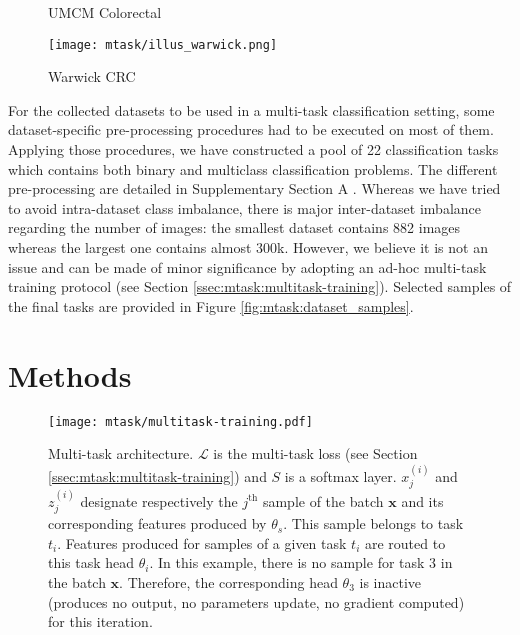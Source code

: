 \begin{figure*}
\begin{subfigure}[t]{0.115\textwidth}
        \caption{UMCM Colorectal}
    \end{subfigure}
    \begin{subfigure}[t]{0.115\textwidth}
        \centering
        \texttt{[image: mtask/illus\_warwick.png]}
        \caption{Warwick CRC}
    \end{subfigure}
    \caption{Overview of our final classification tasks (the display size does not reflect actual image size). In this figure, we provide only one set of selected samples for Breast1 and Breast2 as their corresponding tasks are similar and they originate both from the same set of WSIs.}
    \label{fig:mtask:dataset_samples}
\end{figure*}

For the collected datasets to be used in a multi-task classification setting, some dataset-specific pre-processing procedures had to be executed on most of them. Applying those procedures, we have constructed a pool of 22 classification tasks which contains both binary and multiclass classification problems. The different pre-processing are detailed in Supplementary Section A . Whereas we have tried to avoid intra-dataset class imbalance, there is major inter-dataset imbalance regarding the number of images: the smallest dataset contains 882 images whereas the largest one contains almost 300k. However, we believe it is not an issue and can be made of minor significance by adopting an ad-hoc multi-task training protocol (see Section \ref{ssec:mtask:multitask-training}). Selected samples of the final tasks are provided in Figure \ref{fig:mtask:dataset_samples}. 

\section{Methods}
\label{sec:mtask:methods}

\begin{figure}
    \centering
    \texttt{[image: mtask/multitask-training.pdf]}
    \caption{Multi-task architecture. $\mathcal{L}$ is the multi-task loss (see Section \ref{ssec:mtask:multitask-training}) and $S$ is a softmax layer. $x_j^{(i)}$ and $z_j^{(i)}$ designate respectively the $j^{\text{th}}$ sample of the batch $\mathbf{x}$ and its corresponding features produced by $\theta_s$. This sample belongs to task $t_i$. Features produced for samples of a given task $t_i$ are routed to this task head $\theta_i$. In this example, there is no sample for task 3 in the batch $\mathbf{x}$. Therefore, the corresponding head $\theta_3$ is inactive (\ie produces no output, no parameters update, no gradient computed) for this iteration.}
    \label{fig:mtask:multitask-training}
\end{figure}

